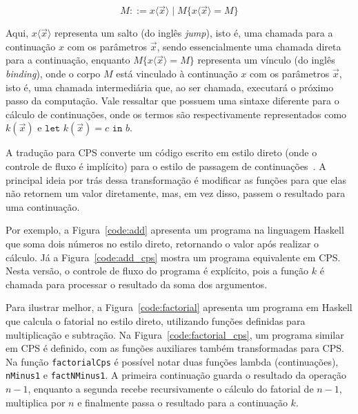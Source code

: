 \begin{equation}
  M ::= x\langle \vec{x} \rangle \mid M\{x\langle \vec{x} \rangle = M\}
\end{equation}

Aqui, $x\langle \vec{x} \rangle$ representa um salto (do inglês \textit{jump}), isto é, uma chamada para a continuação $x$ com os parâmetros $\vec{x}$, sendo essencialmente uma chamada direta para a continuação, enquanto $M\{x\langle \vec{x} \rangle = M\}$ representa um vínculo (do inglês \textit{binding}), onde o corpo $M$ está vinculado à continuação $x$ com os parâmetros $\vec{x}$, isto é, uma chamada intermediária que, ao ser chamada, executará o próximo passo da computação.
Vale ressaltar que  possuem uma sintaxe diferente para o cálculo de continuações, onde os termos são respectivamente representados como $k(\vec{x})$ e $\texttt{let }k(\vec{x}) = c \texttt{ in } b$.

A tradução para CPS converte um código escrito em estilo direto (onde o controle de fluxo é implícito) para o estilo de passagem de continuações~\cite{flanagan1993essence}.
A principal ideia por trás dessa transformação é modificar as funções para que elas não retornem um valor diretamente, mas, em vez disso, passem o resultado para uma continuação.





Por exemplo, a Figura~\ref{code:add} apresenta um programa na linguagem Haskell que soma dois números no estilo direto, retornando o valor após realizar o cálculo.
Já a Figura~\ref{code:add_cps} mostra um programa equivalente em CPS\@.
Nesta versão, o controle de fluxo do programa é explícito, pois a função $k$ é chamada para processar o resultado da soma dos argumentos.





Para ilustrar melhor, a Figura~\ref{code:factorial} apresenta um programa em Haskell que calcula o fatorial no estilo direto, utilizando funções definidas para multiplicação e subtração.
Na Figura~\ref{code:factorial_cps}, um programa similar em CPS é definido, com as funções auxiliares também transformadas para CPS\@.
Na função \texttt{factorialCps} é possível notar duas funções lambda (continuações), \texttt{nMinus1} e \texttt{factNMinus1}.
A primeira continuação guarda o resultado da operação $n - 1$, enquanto a segunda recebe recursivamente o cálculo do fatorial de $n - 1$, multiplica por $n$ e finalmente passa o resultado para a continuação $k$.

